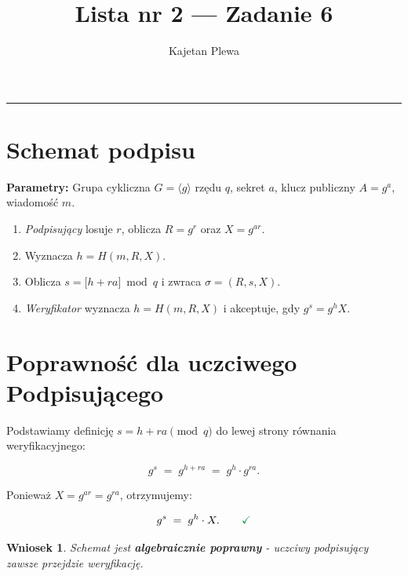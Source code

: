 \documentclass[12pt,a4paper]{article}
\title{
	\textbf{Lista nr 2 --- Zadanie 6}\\[0.4em]
}
\author{Kajetan Plewa}
\date{}
\newtheorem*{wniosek}{Wniosek}
\begin{document}
	
	\maketitle
	\hrule
	\vspace{1em}
	
	\section*{Schemat podpisu}
	
	\begin{schemebox}
		\textbf{Parametry:} Grupa cykliczna $G = \langle g \rangle$ rzędu $q$,
		sekret $a$, klucz publiczny $A = g^a$, wiadomość $m$.
		
		\medskip
		\begin{enumerate}[label=\textbf{\arabic*.}, leftmargin=2em]
			\item \textit{Podpisujący} losuje $r$, oblicza $R = g^r$ oraz $X = g^{ar}$.
			\item Wyznacza $h = H(m, R, X)$.
			\item Oblicza $s = \bigl[h + ra\bigr] \bmod q$ i zwraca $\sigma = (R, s, X)$.
			\item \textit{Weryfikator} wyznacza $h = H(m, R, X)$ i akceptuje, gdy
			$g^s = g^h X$.
		\end{enumerate}
	\end{schemebox}
	
	\section{Poprawność dla uczciwego Podpisującego}
	
	Podstawiamy definicję $s = h + ra \pmod{q}$ do lewej strony równania
	weryfikacyjnego:
	
	\[
	g^s \;=\; g^{h + ra} \;=\; g^h \cdot g^{ra}.
	\]
	
	Ponieważ $X = g^{ar} = g^{ra}$, otrzymujemy:
	
	\[
	g^s \;=\; g^h \cdot X. \qquad {\color{correctgreen}\checkmark}
	\]
	
	\begin{wniosek}
		Schemat jest \textbf{algebraicznie poprawny} - uczciwy podpisujący zawsze
		przejdzie weryfikację.
	\end{wniosek}
	
\end{document}
